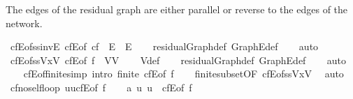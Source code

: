 \begin{isabellebody}
\begin{isamarkuptext}
The edges of the residual graph are either parallel or reverse 
  to the edges of the network.%
\end{isamarkuptext}\isamarkuptrue%
\isamarkupfalse%
\ cfE{\isacharunderscore}of{\isacharunderscore}ss{\isacharunderscore}invE{\isacharcolon}\ {\isachardoublequoteopen}cfE{\isacharunderscore}of\ cf\ {\isasymsubseteq}\ E\ {\isasymunion}\ E{\isasyminverse}{\isachardoublequoteclose}\isanewline
%
\isadelimproof
\ \ %
\endisadelimproof
%
\isatagproof
{}\isamarkupfalse%
\ residualGraph{\isacharunderscore}def\ Graph{\isachardot}E{\isacharunderscore}def\isanewline
\ \ \isamarkupfalse%
\ auto%
\endisatagproof
{\isafoldproof}%
%
\isadelimproof
\isanewline
%
\endisadelimproof
\ \ \isanewline
{}\isamarkupfalse%
\ cfE{\isacharunderscore}of{\isacharunderscore}ss{\isacharunderscore}VxV{\isacharcolon}\ {\isachardoublequoteopen}cfE{\isacharunderscore}of\ f\ {\isasymsubseteq}\ V{\isasymtimes}V{\isachardoublequoteclose}\isanewline
%
\isadelimproof
\ \ %
\endisadelimproof
%
\isatagproof
{}\isamarkupfalse%
\ V{\isacharunderscore}def\isanewline
\ \ \isamarkupfalse%
\ residualGraph{\isacharunderscore}def\ Graph{\isachardot}E{\isacharunderscore}def\isanewline
\ \ \isamarkupfalse%
\ auto%
\endisatagproof
{\isafoldproof}%
%
\isadelimproof
\ \ \isanewline
%
\endisadelimproof
\isanewline
{}\isamarkupfalse%
\ cfE{\isacharunderscore}of{\isacharunderscore}finite{\isacharbrackleft}simp{\isacharcomma}\ intro{\isacharbang}{\isacharbrackright}{\isacharcolon}\ {\isachardoublequoteopen}finite\ {\isacharparenleft}cfE{\isacharunderscore}of\ f{\isacharparenright}{\isachardoublequoteclose}\isanewline
%
\isadelimproof
\ \ %
\endisadelimproof
%
\isatagproof
{}\isamarkupfalse%
\ finite{\isacharunderscore}subset{\isacharbrackleft}OF\ cfE{\isacharunderscore}of{\isacharunderscore}ss{\isacharunderscore}VxV{\isacharbrackright}\ \isamarkupfalse%
\ auto%
\endisatagproof
{\isafoldproof}%
%
\isadelimproof
\isanewline
%
\endisadelimproof
\isanewline
{}\isamarkupfalse%
\ cf{\isacharunderscore}no{\isacharunderscore}self{\isacharunderscore}loop{\isacharcolon}\ {\isachardoublequoteopen}{\isacharparenleft}u{\isacharcomma}u{\isacharparenright}{\isasymnotin}cfE{\isacharunderscore}of\ f{\isachardoublequoteclose}\isanewline
%
\isadelimproof
%
\endisadelimproof
%
\isatagproof
{}\isamarkupfalse%
\isanewline
\ \ \isamarkupfalse%
\ a{}{\isacharcolon}\ {\isachardoublequoteopen}{\isacharparenleft}u{\isacharcomma}\ u{\isacharparenright}\ {\isasymin}\ cfE{\isacharunderscore}of\ f{\isachardoublequoteclose}\isanewline

\end{isabellebody}
